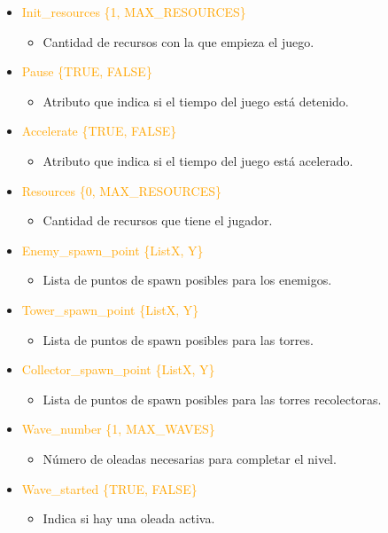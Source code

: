 \documentclass{article}
\begin{document}
\begin{itemize}
        \item \textcolor{Orange}{Init\_resources \{1, MAX\_RESOURCES\}}
    \begin{itemize}
        \item Cantidad de recursos con la que empieza el juego.
    \end{itemize}
    \item \textcolor{Orange}{Pause \{TRUE, FALSE\}}
    \begin{itemize}
        \item Atributo que indica si el tiempo del juego está detenido.
    \end{itemize}
    \item \textcolor{Orange}{Accelerate \{TRUE, FALSE\}}
    \begin{itemize}
        \item Atributo que indica si el tiempo del juego está acelerado.
    \end{itemize}
    \item \textcolor{Orange}{Resources \{0, MAX\_RESOURCES\}}
    \begin{itemize}
        \item Cantidad de recursos que tiene el jugador.
    \end{itemize}
    \clearpage
    \item \textcolor{Orange}{Enemy\_spawn\_point \{List{X, Y}\}}
    \begin{itemize}
        \item Lista de puntos de spawn posibles para los enemigos.
    \end{itemize}
    \item \textcolor{Orange}{Tower\_spawn\_point \{List{X, Y}\}}
    \begin{itemize}
        \item Lista de puntos de spawn posibles para las torres.
    \end{itemize}
     \item \textcolor{Orange}{Collector\_spawn\_point \{List{X, Y}\}}
    \begin{itemize}
        \item Lista de puntos de spawn posibles para las torres recolectoras.
    \end{itemize}
    \item \textcolor{Orange}{Wave\_number \{1, MAX\_WAVES\}}
    \begin{itemize}
        \item Número de oleadas necesarias para completar el nivel.
    \end{itemize}
    \item \textcolor{Orange}{Wave\_started \{TRUE, FALSE\}}
    \begin{itemize}
        \item Indica si hay una oleada activa.
    \end{itemize}
\end{itemize}
\end{document}

